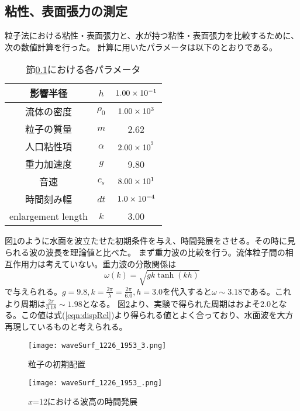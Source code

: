 \documentclass[]{jsarticle}
\begin{document}
\subsection{粘性、表面張力の測定}
\label{subsec:surfaceCoef}
粒子法における粘性・表面張力と、水が持つ粘性・表面張力を比較するために、次の数値計算を行った。
計算に用いたパラメータは以下のとおりである。
\begin{table}[h]
  \caption{節\ref{subsec:surfaceCoef}における各パラメータ}
  \begin{center}
    \begin{tabular}{|c|c|c|}\hline
      影響半径&$h$&$\rm{1.00\times10^{-1}}$ \\ \hline
      流体の密度&$\rho_0$&$\rm{1.00\times10^3}$ \\ \hline
      粒子の質量&$m$&2.62 \\ \hline
      人口粘性項&$\alpha$&$\rm{2.00\times10^{^2}}$ \\ \hline
      重力加速度&$g$&9.80 \\ \hline
      音速&$c_s$&$\rm{8.00\times10^1}$ \\ \hline
      時間刻み幅&$dt$&$\rm{1.0\times10^{-4}}$ \\ \hline
      enlargement length&$k$&3.00 \\ \hline
    \end{tabular}
  \end{center}
\end{table}

図\ref{fig:waveSurfInit}のように水面を波立たせた初期条件を与え、時間発展をさせる。その時に見られる波の波長を理論値と比べた。
まず重力波の比較を行う。流体粒子間の相互作用力は考えていない。重力波の分散関係は
\begin{equation}
  \label{eqn:dispRel}
  \omega(k)=\sqrt{gk \tanh (kh)}
\end{equation}
で与えられる\cite{tatsumiKiso}。$g=9.8, k=\frac{2\pi}{\lambda}=\frac{2\pi}{6.0}, h=3.0$を代入すると$\omega\sim3.18$である。これより周期は$\frac{2\pi}{3.18}\sim1.98$となる。
図\ref{fig:waveSurfEvol}より、実験で得られた周期はおよそ2.0となる。この値は式(\ref{eqn:dispRel})より得られる値とよく合っており、水面波を大方再現しているものと考えられる。
\begin{figure}[H]
  \centering
  \texttt{[image: waveSurf\_1226\_1953\_3.png]}
  \caption{粒子の初期配置}
  \label{fig:waveSurfInit}
\end{figure}
\begin{figure}[H]
  \centering
  \texttt{[image: waveSurf\_1226\_1953\_.png]}
  \caption{$x$=12における波高の時間発展}
  \label{fig:waveSurfEvol}
\end{figure}
\end{document}
